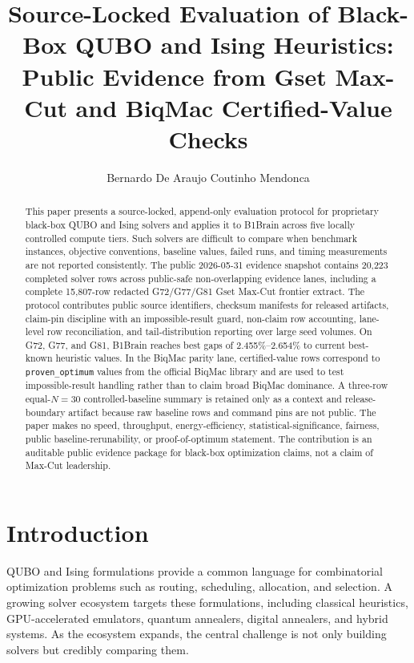 \documentclass[11pt]{article}
\title{Source-Locked Evaluation of Black-Box QUBO and Ising Heuristics: Public Evidence from Gset Max-Cut and BiqMac Certified-Value Checks}
\author[1]{Bernardo De Araujo Coutinho Mendonca}
\affil[1]{Independent Researcher, United States of America\\
\texttt{acmbernie@gmail.com}}
\date{}
\begin{document}
\maketitle

\begin{abstract}
This paper presents a source-locked, append-only evaluation protocol for proprietary black-box QUBO and Ising solvers and applies it to B1Brain across five locally controlled compute tiers. Such solvers are difficult to compare when benchmark instances, objective conventions, baseline values, failed runs, and timing measurements are not reported consistently. The public 2026-05-31 evidence snapshot contains 20,223 completed solver rows across public-safe non-overlapping evidence lanes, including a complete 15,807-row redacted G72/G77/G81 Gset Max-Cut frontier extract. The protocol contributes public source identifiers, checksum manifests for released artifacts, claim-pin discipline with an impossible-result guard, non-claim row accounting, lane-level row reconciliation, and tail-distribution reporting over large seed volumes. On G72, G77, and G81, B1Brain reaches best gaps of 2.455\%--2.654\% to current best-known heuristic values. In the BiqMac parity lane, certified-value rows correspond to \texttt{proven\_optimum} values from the official BiqMac library and are used to test impossible-result handling rather than to claim broad BiqMac dominance. A three-row equal-$N=30$ controlled-baseline summary is retained only as a context and release-boundary artifact because raw baseline rows and command pins are not public. The paper makes no speed, throughput, energy-efficiency, statistical-significance, fairness, public baseline-rerunability, or proof-of-optimum statement. The contribution is an auditable public evidence package for black-box optimization claims, not a claim of Max-Cut leadership.
\end{abstract}

\section{Introduction}
QUBO and Ising formulations provide a common language for combinatorial optimization problems such as routing, scheduling, allocation, and selection. A growing solver ecosystem targets these formulations, including classical heuristics, GPU-accelerated emulators, quantum annealers, digital annealers, and hybrid systems. As the ecosystem expands, the central challenge is not only building solvers but credibly comparing them.
\end{document}
